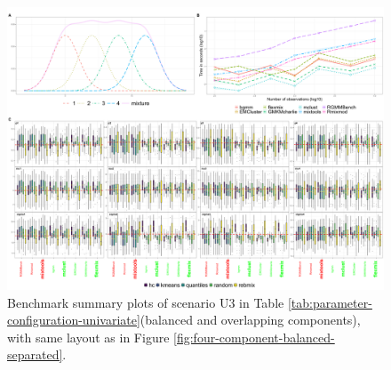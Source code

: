 \begin{figure}

{\centering \includegraphics[width=1\linewidth]{./figs/univariate/univariate_balanced_overlapping} 

}

\caption{Benchmark summary plots of scenario U3 in Table \ref{tab:parameter-configuration-univariate}(balanced and overlapping components), with same layout as in Figure \ref{fig:four-component-balanced-separated}.}\label{fig:four-component-balanced-overlapping}
\end{figure}

\newpage

